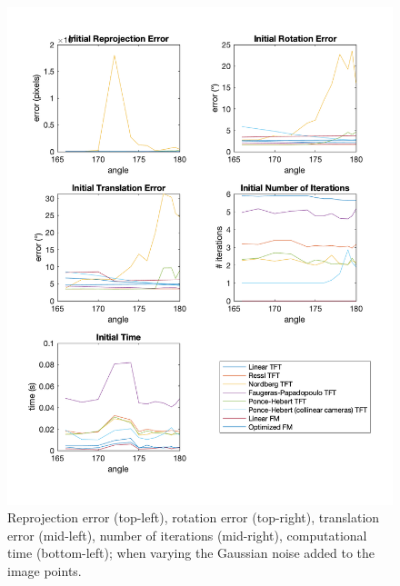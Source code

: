 \begin{figure}[p]
	\centering
	\includegraphics[width=1\textwidth]{Experiments/Synthetic/angle/INITanglePlots.png}
	\caption{Reprojection error (top-left), rotation error (top-right), translation error (mid-left), number of iterations (mid-right), computational time (bottom-left); when varying the Gaussian noise added to the image points.}
\end{figure}

